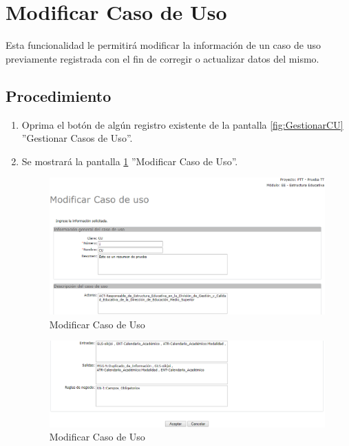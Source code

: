 \hypertarget{cv:modificarCU}{\section{Modificar Caso de Uso}} \label{sec:modificarCU}

	Esta funcionalidad le permitirá modificar la información de un caso de uso previamente registrada con el fin de corregir o actualizar datos del mismo. 

		\subsection{Procedimiento}

			\begin{enumerate}
	
			\item Oprima el botón \IUEditar{} de algún registro existente de la pantalla \ref{fig:GestionarCU} ''Gestionar Casos de Uso''.
	
			\item Se mostrará la pantalla \ref{fig:modificarCUA} ''Modificar Caso de Uso''.
			
			\begin{figure}[H]
				\begin{center}
					\includegraphics[scale=0.5]{roles/lider/casosUso/pantallas/IU12-2modificarCUA}
					\caption{Modificar Caso de Uso}
					\label{fig:modificarCUA}
				\end{center}
			\end{figure}
		
			\begin{figure}[H]
				\begin{center}
					\includegraphics[scale=0.5]{roles/lider/casosUso/pantallas/IU12-2modificarCUB}
					\caption{Modificar Caso de Uso}
					\label{fig:modificarCUB}
				\end{center}
			\end{figure}
		

\end{enumerate}
